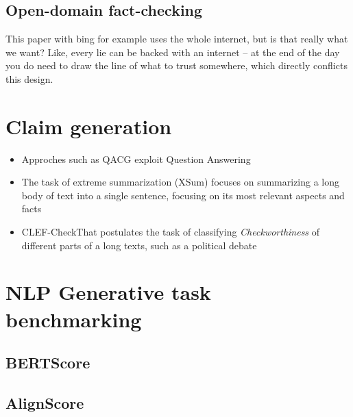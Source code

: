 \subsection{Open-domain fact-checking}
This paper with bing for example uses the whole internet, but is that really what we want? Like, every lie can be backed with an internet -- at the end of the day you do need to draw the line of what to trust somewhere, which directly conflicts this design.

\section{Claim generation}
\begin{itemize}
    \item Approches such as QACG exploit Question Answering
    \item The task of extreme summarization (XSum) focuses on summarizing a long body of text into a single sentence, focusing on its most relevant aspects and facts
    \item CLEF-CheckThat postulates the task of classifying \textit{Checkworthiness} of different parts of a long texts, such as a political debate
\end{itemize}

\section{NLP Generative task benchmarking}
\subsection{BERTScore}
\subsection{AlignScore}